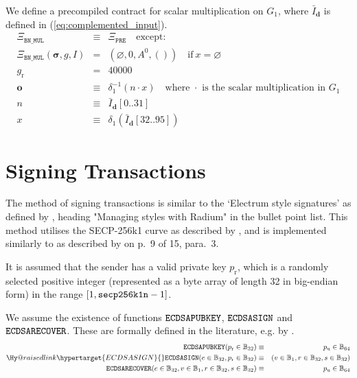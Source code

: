 \documentclass[9pt,oneside]{amsart}
\makeatletter
\newcommand{\linkdest}[1]{\Hy@raisedlink{\hypertarget{#1}{}}}
\newcommand*\eg{e.g.\@\xspace}
\makeatother
\begin{document}
We define a precompiled contract for scalar multiplication on $G_1$, where $\bar I_{\mathbf d}$ is defined in (\ref{eq:complemented_input}).
\begin{eqnarray}
\Xi_{\mathtt{BN\_MUL}}&\equiv&\Xi_{\mathtt{PRE}}\quad\text{except:}\\
\Xi_{\mathtt{BN\_MUL}}(\boldsymbol\sigma,g,I)&=&(\varnothing,0,A^0,())\quad\text{if}\ x=\varnothing\\
g_{\mathrm{r}} &=& 40000\\
\mathbf o&\equiv&\delta_1^{-1}(n\cdot x)\quad\text{where $\cdot$ is the scalar multiplication in $G_1$}\\
n&\equiv&\bar I_{\mathbf d}[0..31]\\
x&\equiv&\delta_1(\bar I_{\mathbf d}[32..95])
\end{eqnarray}

\section{Signing Transactions}\label{app:signing}

The method of signing transactions is similar to the `Electrum style signatures' as defined by \cite{npmElectrum2017}, heading "Managing styles with Radium" in the bullet point list. This method utilises the SECP-256k1 curve as described by \cite{Courtois2014}, and is implemented similarly to as described by \cite{gura2004comparing} on p.~9 of 15, para.~3.

It is assumed that the sender has a valid private key $p_{\mathrm{r}}$, which is a randomly selected positive integer (represented as a byte array of length 32 in big-endian form) in the range \hbox{$[1, \mathtt{\tiny secp256k1n} - 1]$}.

We assume the existence of functions $\mathtt{\small ECDSAPUBKEY}$, $\mathtt{\small ECDSASIGN}$ and $\mathtt{\small ECDSARECOVER}$. These are formally defined in the literature, \eg by \cite{ECDSAcerticom}.
\begin{eqnarray}
\mathtt{\small ECDSAPUBKEY}(p_{\mathrm{r}} \in \mathbb{B}_{32}) & \equiv & p_{\mathrm{u}} \in \mathbb{B}_{64} \\
\linkdest{ECDSASIGN}\mathtt{\small ECDSASIGN}(e \in \mathbb{B}_{32}, p_{\mathrm{r}} \in \mathbb{B}_{32}) & \equiv & (v \in \mathbb{B}_{1}, r \in \mathbb{B}_{32}, s \in \mathbb{B}_{32}) \\
\mathtt{\small ECDSARECOVER}(e \in \mathbb{B}_{32}, v \in \mathbb{B}_{1}, r \in \mathbb{B}_{32}, s \in \mathbb{B}_{32}) & \equiv & p_{\mathrm{u}} \in \mathbb{B}_{64}
\end{eqnarray}
\end{document}
